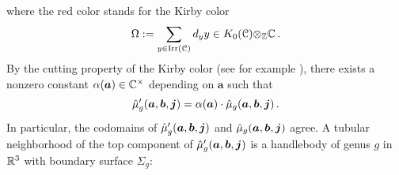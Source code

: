\documentclass[11pt]{article}
\begin{document}
where the red color stands for the Kirby color 
\begin{equation}\label{eq:kirby}
\Omega := \sum_{y \in {\operatorname{Irr}}(\mathcal{C})} d_y y \in K_0(\mathcal{C}) {\otimes}_{{\mathbb{Z}}}{\mathbb{C}}\,.
\end{equation}
By the cutting property of the Kirby color (see for example \cite[Cor.~3.1.11]{BK01}), there exists a nonzero constant $\alpha(\bm{a}) \in {\mathbb{C}}^{\times}$ depending on $\bm{a}$  such that 
\begin{equation}
\hat{\mu}'_{g}(\bm{a}, \bm{b}, \bm{j}) = \alpha(\bm{a}) \cdot \hat{\mu}_{g}(\bm{a}, \bm{b}, \bm{j})\,.
\end{equation}
In particular, the codomains of $\hat{\mu}'_{g}(\bm{a}, \bm{b}, \bm{j})$ and $\hat{\mu}_{g}(\bm{a}, \bm{b}, \bm{j})$ agree. A tubular neighborhood of the top component of $\hat{\mu}'_{g}(\bm{a}, \bm{b}, \bm{j})$ is a handlebody of genus $g$ in ${\mathbb{R}}^3$ with boundary surface $\Sigma_g$:
\end{document}
